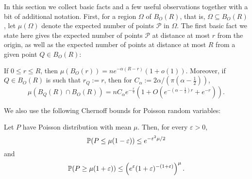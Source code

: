 In this section we collect basic facts and a few useful observations together with a bit of additional notation.
First, for a region $\Omega$ of $B_O(R)$, that is, $\Omega\subseteq B_O(R)$, let $\mu(\Omega)$ denote the expected number of points $\mathcal{P}$ in $\Omega$. The first basic fact we state here gives the expected number of points $\mathcal{P}$ at distance at most $r$ from the origin, 
as well as the expected number of points at distance at most $R$ from a given point $Q \in B_{O}(R)$:
\begin{lemma}\label{lem:muBall}
If $0\leq r\leq R$, then
  $\mu(B_{O}(r)) = n e^{-\alpha(R-r)}(1+o(1))$.
Moreover, if $Q \in B_O(R)$ is such that $r_Q:=r$, then 
for $C_{\alpha}:=2\alpha/(\pi (\alpha-\frac12))$,
\[
\mu(B_Q(R) \cap B_O(R)) = n C_{\alpha} e^{-\frac{r}{2}}(1 + O(e^{-(\alpha-\frac12)r}+e^{-r})).
\]
\end{lemma}


We also use the following Chernoff bounds for Poisson random variables:
\begin{theorem}
Let $P$ have Poisson distribution with mean $\mu$. Then, for every $\varepsilon > 0$,
$$
\P(P \le \mu(1-\varepsilon)) \le e^{-\varepsilon^2 \mu/2}
$$
and
$$
\P(P \ge \mu(1+\varepsilon)) \le \left(e^{\varepsilon} (1+\varepsilon)^{-(1+\varepsilon)} \right)^{\mu}.
$$
\end{theorem}


